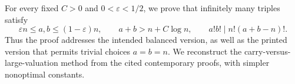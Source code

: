 For every fixed $C>0$ and $0<\varepsilon<1/2$, we prove that infinitely many triples satisfy
\[
 \varepsilon n\leq a,b\leq(1-\varepsilon)n,\qquad
 a+b>n+C\log n,\qquad a!b!\mid n!(a+b-n)!.
\]
Thus the proof addresses the intended balanced version, as well as the printed version that permits trivial choices $a=b=n$. We reconstruct the carry-versus-large-valuation method from the cited contemporary proofs, with simpler nonoptimal constants.

